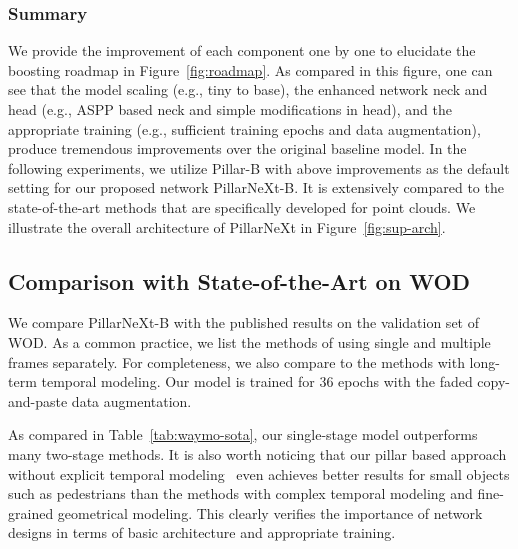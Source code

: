 \documentclass[10pt,twocolumn,letterpaper]{article}
\begin{document}
\subsubsection{Summary}
We provide the improvement of each component one by one to elucidate the boosting roadmap in Figure~\ref{fig:roadmap}. As compared in this figure, one can see that the model scaling (e.g., tiny to base), the enhanced network neck and head (e.g., ASPP based neck and simple modifications in head), and the appropriate training (e.g., sufficient training epochs and data augmentation), produce tremendous improvements over the original baseline model. In the following experiments, we utilize Pillar-B with above improvements as the default setting for our proposed network PillarNeXt-B. It is extensively compared to the state-of-the-art methods that are specifically developed for point clouds. We illustrate the overall architecture of PillarNeXt in Figure~\ref{fig:sup-arch}. 


\subsection{Comparison with State-of-the-Art on WOD}
We compare PillarNeXt-B with the published results on the validation set of WOD. As a common practice, we list the methods of using single and multiple frames separately. For completeness, we also compare to the methods with long-term temporal modeling. Our model is trained for 36 epochs with the faded copy-and-paste data augmentation.

As compared in Table~\ref{tab:waymo-sota}, our single-stage model outperforms many two-stage methods. It is also worth noticing that our pillar based approach without explicit temporal modeling~\cite{prernn} even achieves better results for small objects such as pedestrians than the methods with complex temporal modeling and fine-grained geometrical modeling. This clearly verifies the importance of network designs in terms of basic architecture and appropriate training.
\end{document}
